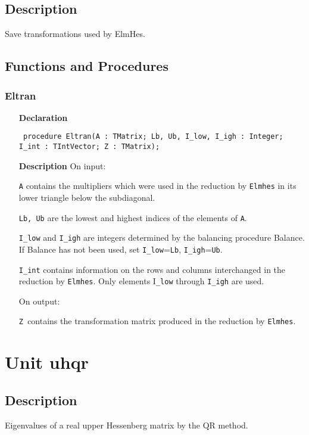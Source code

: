 \documentclass[12pt,a4paper,oneside]{report}
\newcommand{\declarationitem}[1]{\textbf{#1}}
\newcommand{\descriptiontitle}[1]{\textbf{#1}}
\newcommand{\code}[1]{\texttt{#1}}
\begin{document}
\subsection{Description}
Save transformations used by ElmHes. 
\subsection{Functions and Procedures}
\subsubsection{Eltran}
\label{ueltran-Eltran}
\begin{itemize}\item[\declarationitem{Declaration}\hfill]
	\begin{flushleft}
		\code{
			procedure Eltran(A : TMatrix; Lb, Ub, I{\_}low, I{\_}igh : Integer; I{\_}int : TIntVector; Z : TMatrix);}
	\end{flushleft}
	\item[\descriptiontitle{Description}]
	On input:
	
	\code{A} contains the multipliers which were used in the reduction by \code{Elmhes} in its lower triangle below the subdiagonal.
	
	\code{Lb, Ub} are the lowest and highest indices of the elements of \code{A}.
	
	\code{I{\_}low} and \code{I{\_}igh} are integers determined by the balancing procedure Balance. If Balance has not been used, set \code{I{\_}low}=\code{Lb}, \code{I{\_}igh}=\code{Ub}.
	
	\code{I{\_}int} contains information on the rows and columns interchanged in the reduction by \code{Elmhes}. Only elements I\code{{\_}low} through \code{I{\_}igh} are used.
	
	On output:
	
	\code{Z }contains the transformation matrix produced in the reduction by \code{Elmhes}.
	
\end{itemize}

\section{Unit uhqr}
\label{uhqr}
\subsection{Description}
Eigenvalues of a real upper Hessenberg matrix by the QR method.
\end{document}
